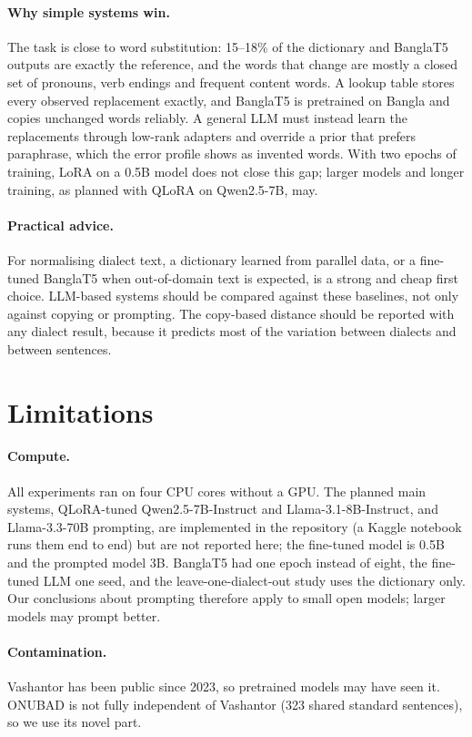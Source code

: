 \documentclass[10pt,twocolumn]{article}
\begin{document}
\paragraph{Why simple systems win.} The task is close to word substitution: 15--18\% of the dictionary and
BanglaT5 outputs are exactly the reference, and the words that change are mostly a closed set of pronouns,
verb endings and frequent content words. A lookup table stores every observed replacement exactly, and
BanglaT5 is pretrained on Bangla and copies unchanged words reliably. A general LLM must instead learn the
replacements through low-rank adapters and override a prior that prefers paraphrase, which the error profile
shows as invented words. With two epochs of training, LoRA on a 0.5B model does not close this gap; larger models and
longer training, as planned with QLoRA on Qwen2.5-7B, may.

\paragraph{Practical advice.} For normalising dialect text, a dictionary learned from parallel data, or a
fine-tuned BanglaT5 when out-of-domain text is expected, is a strong and cheap first choice. LLM-based systems
should be compared against these baselines, not only against copying or prompting. The copy-based distance
should be reported with any dialect result, because it predicts most of the variation between dialects and
between sentences.

\section{Limitations}
\paragraph{Compute.} All experiments ran on four CPU cores without a GPU. The planned main systems,
QLoRA-tuned Qwen2.5-7B-Instruct and Llama-3.1-8B-Instruct, and Llama-3.3-70B prompting, are implemented in the
repository (a Kaggle notebook runs them end to end) but are not reported here; the fine-tuned model is 0.5B and
the prompted model 3B. BanglaT5 had one epoch instead of eight, the fine-tuned LLM one seed, and the
leave-one-dialect-out study uses the dictionary only. Our conclusions about prompting therefore apply to
small open models; larger models may prompt better.

\paragraph{Contamination.} Vashantor has been public since 2023, so pretrained models may have seen it.
ONUBAD is not fully independent of Vashantor (323 shared standard sentences), so we use its novel part.
\end{document}
